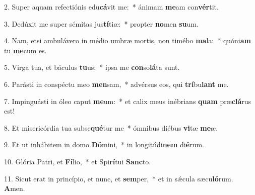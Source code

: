 2. Super aquam refectiónis edu\textbf{cá}vit me:~*  ánimam \textbf{me}am con\textbf{vér}tit.\

3. Dedúxit me super sémitas jus\textbf{tí}tiæ:~*  propter \textbf{no}men \textbf{su}um.\

4. Nam, etsi ambulávero in médio umbræ mortis, non timébo \textbf{ma}la:~*  quóni\textbf{am} tu \textbf{me}cum es.\

5. Virga tua, et báculus \textbf{tu}us:~*  ipsa me \textbf{con}so\textbf{lá}ta sunt.\

6. Parásti in conspéctu meo \textbf{men}sam,~*  advérsus eos, qui \textbf{trí}bu\textbf{lant} me.\

7. Impinguásti in óleo caput \textbf{me}um:~*  et calix meus inébrians \textbf{quam} præ\textbf{clá}rus est!\

8. Et misericórdia tua subse\textbf{qué}tur me~*  ómnibus diébus \textbf{vi}tæ \textbf{me}æ.\

9. Et ut inhábitem in domo \textbf{Dó}mini,~*  in longitúdi\textbf{nem} di\textbf{é}rum.\

10. Glória Patri, et \textbf{Fí}lio,~*  et Spi\textbf{rí}tui \textbf{Sanc}to.\

11. Sicut erat in princípio, et nunc, et \textbf{sem}per,~*  et in sǽcula sæcu\textbf{ló}rum. \textbf{A}men.\


